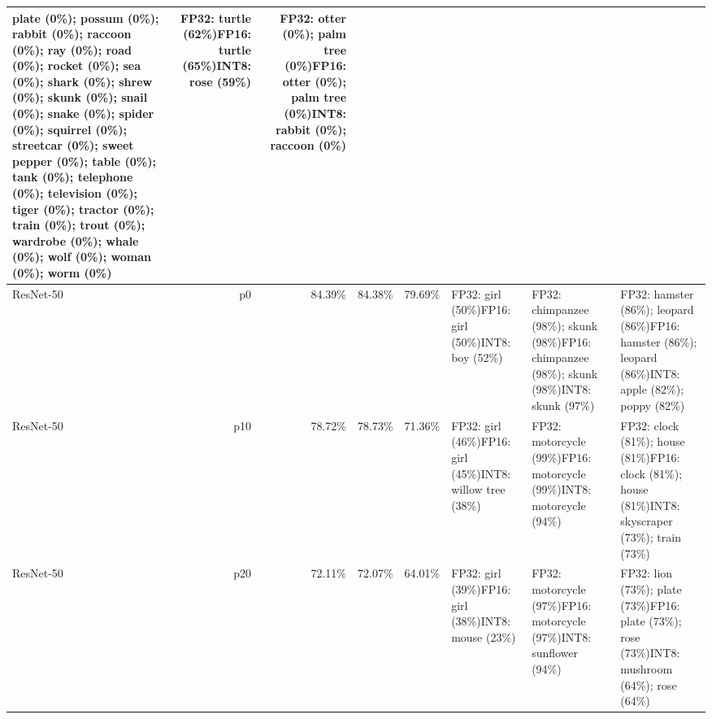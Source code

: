 \begin{longtable}{p{2.8cm} r r r r p{5.0cm} p{4.2cm} p{4.2cm}}
plate (0\%); possum (0\%); rabbit (0\%); raccoon (0\%); ray (0\%); road (0\%); rocket (0\%); sea (0\%); shark (0\%); shrew (0\%); skunk (0\%); snail (0\%); snake (0\%); spider (0\%); squirrel (0\%); streetcar (0\%); sweet pepper (0\%); table (0\%); tank (0\%); telephone (0\%); television (0\%); tiger (0\%); tractor (0\%); train (0\%); trout (0\%); wardrobe (0\%); whale (0\%); wolf (0\%); woman (0\%); worm (0\%) & FP32: turtle (62\%)\newline FP16: turtle (65\%)\newline INT8: rose (59\%) & FP32: otter (0\%); palm tree (0\%)\newline FP16: otter (0\%); palm tree (0\%)\newline INT8: rabbit (0\%); raccoon (0\%) \\ \hline
ResNet-50 & p0 & 84.39\% & 84.38\% & 79.69\% & FP32: girl (50\%)\newline FP16: girl (50\%)\newline INT8: boy (52\%) & FP32: chimpanzee (98\%); skunk (98\%)\newline FP16: chimpanzee (98\%); skunk (98\%)\newline INT8: skunk (97\%) & FP32: hamster (86\%); leopard (86\%)\newline FP16: hamster (86\%); leopard (86\%)\newline INT8: apple (82\%); poppy (82\%) \\ \hline
ResNet-50 & p10 & 78.72\% & 78.73\% & 71.36\% & FP32: girl (46\%)\newline FP16: girl (45\%)\newline INT8: willow tree (38\%) & FP32: motorcycle (99\%)\newline FP16: motorcycle (99\%)\newline INT8: motorcycle (94\%) & FP32: clock (81\%); house (81\%)\newline FP16: clock (81\%); house (81\%)\newline INT8: skyscraper (73\%); train (73\%) \\ \hline
ResNet-50 & p20 & 72.11\% & 72.07\% & 64.01\% & FP32: girl (39\%)\newline FP16: girl (38\%)\newline INT8: mouse (23\%) & FP32: motorcycle (97\%)\newline FP16: motorcycle (97\%)\newline INT8: sunflower (94\%) & FP32: lion (73\%); plate (73\%)\newline FP16: plate (73\%); rose (73\%)\newline INT8: mushroom (64\%); rose (64\%) \\ \hline

\end{longtable}
